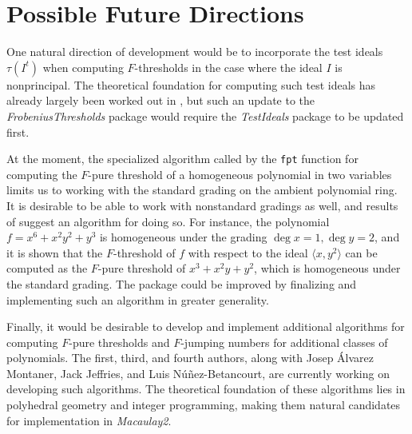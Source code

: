 \documentclass{amsart}
\begin{document}
\section{Possible Future Directions}
\label{sec.FutureDirections}

One natural direction of development would be to  incorporate the test ideals $\tau(I^t)$ when computing $F$-thresholds in the case where the ideal $I$ is nonprincipal.
The theoretical foundation for computing such test ideals has already largely been worked out in \cite{SchwedeTuckerTestIdealsOfNonPrincipal}, but such an update to the \emph{FrobeniusThresholds} package would require the  \emph{TestIdeals} package to be updated first.

At the moment, the specialized algorithm called by the \texttt{fpt} function for computing the $F$-pure threshold of a homogeneous polynomial in two variables limits us to working with the standard grading on the ambient polynomial ring.  It is desirable to be able to work with nonstandard gradings as well, and results of \cite{HernandezTeixeiraFThresholdFunctions} suggest an algorithm for doing so.  For instance, the polynomial $f = x^6+x^2 y^2 + y^3$ is homogeneous under the grading $\deg x = 1, \deg y = 2$, and it is shown that the $F$-threshold of $f$ with respect to the ideal $\langle x, y^2 \rangle$ can be computed as the $F$-pure threshold of $x^3 + x^2 y + y^2$, which is homogeneous under the standard grading.
The package could be improved by finalizing and implementing such an algorithm in greater generality.

Finally, it would be desirable to develop and implement additional algorithms for computing $F$-pure thresholds and $F$-jumping numbers for additional classes of polynomials.  The first, third, and fourth authors, along with Josep \'Alvarez Montaner, Jack Jeffries, and Luis N\'u\~nez-Betancourt,  are currently working on developing such algorithms.  The theoretical foundation of these algorithms lies in polyhedral geometry and integer programming, making them natural candidates for  implementation in \emph{Macaulay2}.  




\end{document}
